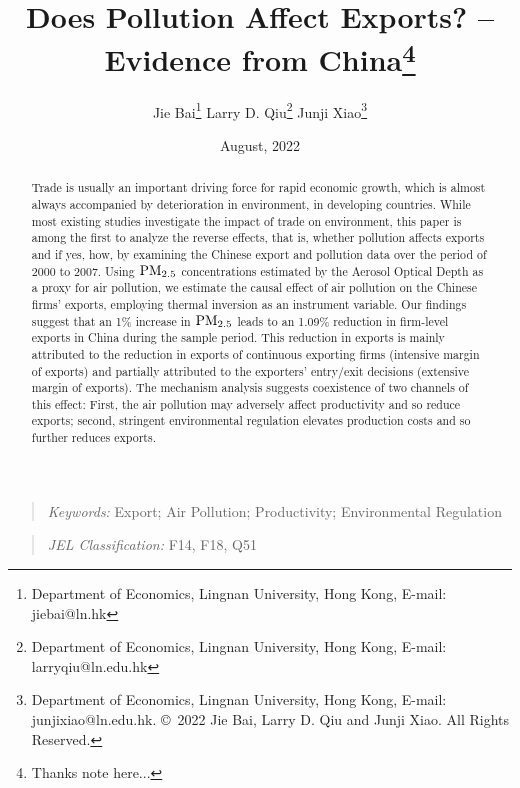 \documentclass[12pt]{article}
\begin{document}
\title{Does Pollution Affect Exports? -- Evidence from China\thanks{Thanks note here...}}
\author{Jie Bai\thanks{Department of Economics, Lingnan University, Hong Kong, E-mail: jiebai@ln.hk} \quad Larry D. Qiu\thanks{Department of Economics, Lingnan University, Hong Kong, E-mail: larryqiu@ln.edu.hk} \quad Junji Xiao\thanks{Department of Economics, Lingnan University, Hong Kong, E-mail: junjixiao@ln.edu.hk.  \copyright\ 2022 Jie Bai, Larry D. Qiu and Junji Xiao. All Rights Reserved. }}
\date{August, 2022}
\maketitle
\thispagestyle{empty}
\begin{abstract}
  Trade is usually an important driving force for rapid economic growth, which is almost always accompanied by deterioration in environment, in developing countries. While most existing studies investigate the impact of trade on environment, this paper is among the first to analyze the reverse effects, that is, whether pollution affects exports and if yes, how, by examining the Chinese export and pollution data over the period of 2000 to 2007. Using $\rm PM_{2.5}$ concentrations estimated by the Aerosol Optical Depth as a proxy for air pollution, we estimate the causal effect of air pollution on the Chinese firms' exports, employing thermal inversion as an instrument variable. Our findings suggest that an 1\% increase in $\rm PM_{2.5}$ leads to an 1.09\% reduction in firm-level exports in China during the sample period. This reduction in exports is mainly attributed to the reduction in exports of continuous exporting firms (intensive margin of exports) and partially attributed to the exporters' entry/exit decisions (extensive margin of exports). The mechanism analysis suggests coexistence of two channels of this effect: First, the air pollution may adversely affect productivity and so reduce exports; second, stringent environmental regulation elevates production costs and so further reduces exports. 
\end{abstract}
\begin{quote}
\emph{Keywords:} Export; Air Pollution; Productivity; Environmental Regulation
\end{quote}
\begin{quote}
\emph{JEL Classification:} 
F14, F18, Q51
\end{quote}

\newpage
\setcounter{page}{1}
\end{document}
